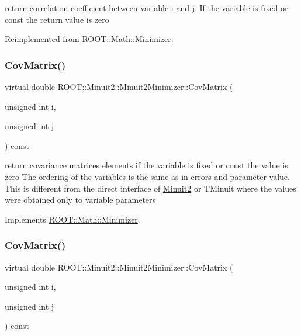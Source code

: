 return correlation coefficient between variable i and j. If the variable is fixed or const the return value is zero 

Reimplemented from \mbox{\hyperlink{classROOT_1_1Math_1_1Minimizer_a9ba2f4bc3c8c0e905f2c018e79809c0e}{R\+O\+O\+T\+::\+Math\+::\+Minimizer}}.

\mbox{\label{classROOT_1_1Minuit2_1_1Minuit2Minimizer_a6ba10de01ab6e7228fa4908894de5619}} 
\subsubsection{\texorpdfstring{CovMatrix()}{CovMatrix()}\hspace{0.1cm}{\footnotesize\ttfamily [1/3]}}
{\footnotesize\ttfamily virtual double R\+O\+O\+T\+::\+Minuit2\+::\+Minuit2\+Minimizer\+::\+Cov\+Matrix (\begin{DoxyParamCaption}\item[{unsigned int}]{i,  }\item[{unsigned int}]{j }\end{DoxyParamCaption}) const\hspace{0.3cm}{\ttfamily [virtual]}}

return covariance matrices elements if the variable is fixed or const the value is zero The ordering of the variables is the same as in errors and parameter value. This is different from the direct interface of \mbox{\hyperlink{namespaceROOT_1_1Minuit2}{Minuit2}} or T\+Minuit where the values were obtained only to variable parameters 

Implements \mbox{\hyperlink{classROOT_1_1Math_1_1Minimizer_a01b0ec371972dab12ca3b9c962d952f8}{R\+O\+O\+T\+::\+Math\+::\+Minimizer}}.

\mbox{\label{classROOT_1_1Minuit2_1_1Minuit2Minimizer_a6ba10de01ab6e7228fa4908894de5619}} 
\subsubsection{\texorpdfstring{CovMatrix()}{CovMatrix()}\hspace{0.1cm}{\footnotesize\ttfamily [2/3]}}
{\footnotesize\ttfamily virtual double R\+O\+O\+T\+::\+Minuit2\+::\+Minuit2\+Minimizer\+::\+Cov\+Matrix (\begin{DoxyParamCaption}\item[{unsigned int}]{i,  }\item[{unsigned int}]{j }\end{DoxyParamCaption}) const\hspace{0.3cm}{\ttfamily [virtual]}}

